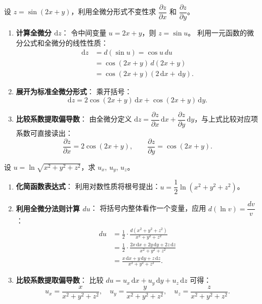 \documentclass[lang=cn,11pt]{elegantbook}
\begin{document}
\begin{exercise}[利用全微分形式不变性求偏导] \label{ex:diff-invariance-1}
设 $z=\sin(2x+y)$，利用全微分形式不变性求 $\dfrac{\partial z}{\partial x}$ 和 $\dfrac{\partial z}{\partial y}$。
\end{exercise}

\begin{solution}
\begin{enumerate}
  \item \textbf{计算全微分 $\mathrm{d}z$}：
  令中间变量 $u=2x+y$，则 $z=\sin u$。
  利用一元函数的微分公式和全微分的线性性质：
  \begin{align*}
  \mathrm{d}z &= d(\sin u) = \cos u\,du \\
     &= \cos(2x+y)\,d(2x+y) \\
     &= \cos(2x+y)(2\,\mathrm{d}x+\,\mathrm{d}y).
  \end{align*}

  \item \textbf{展开为标准全微分形式}：
  乘开括号：
  \[
  \mathrm{d}z=2\cos(2x+y)\,\mathrm{d}x+\cos(2x+y)\,\mathrm{d}y.
  \]

  \item \textbf{比较系数提取偏导数}：
  由全微分定义 $\mathrm{d}z=\dfrac{\partial z}{\partial x}\,\mathrm{d}x+\dfrac{\partial z}{\partial y}\,\mathrm{d}y$，与上式比较对应项系数可直接读出：
  \[
  \boxed{\frac{\partial z}{\partial x}=2\cos(2x+y)},\qquad
  \boxed{\frac{\partial z}{\partial y}=\cos(2x+y)}.
  \]
\end{enumerate}
\end{solution}

\begin{exercise}[三元函数的全微分求偏导] \label{ex:diff-invariance-2}
设 $u=\ln\sqrt{x^2+y^2+z^2}$，求 $u_x$, $u_y$, $u_z$。
\end{exercise}

\begin{solution}
\begin{enumerate}
  \item \textbf{化简函数表达式}：
  利用对数性质将根号提出：$u=\dfrac12\ln(x^2+y^2+z^2)$。

  \item \textbf{利用全微分法则计算 $du$}：
  将括号内整体看作一个变量，应用 $d(\ln v) = \dfrac{dv}{v}$：
  \begin{align*}
  du &= \frac12\cdot\frac{d(x^2+y^2+z^2)}{x^2+y^2+z^2} \\
     &= \frac12\cdot\frac{2x\,\mathrm{d}x+2y\,\mathrm{d}y+2z\,\mathrm{d}z}{x^2+y^2+z^2} \\
     &= \frac{x\,\mathrm{d}x+y\,\mathrm{d}y+z\,\mathrm{d}z}{x^2+y^2+z^2}.
  \end{align*}

  \item \textbf{比较系数提取偏导数}：
  比较 $du = u_x\,\mathrm{d}x + u_y\,\mathrm{d}y + u_z\,\mathrm{d}z$ 可得：
  \[
  \boxed{u_x=\frac{x}{x^2+y^2+z^2}},\quad
  \boxed{u_y=\frac{y}{x^2+y^2+z^2}},\quad
  \boxed{u_z=\frac{z}{x^2+y^2+z^2}}.
  \]
\end{enumerate}
\end{solution}
\end{document}
